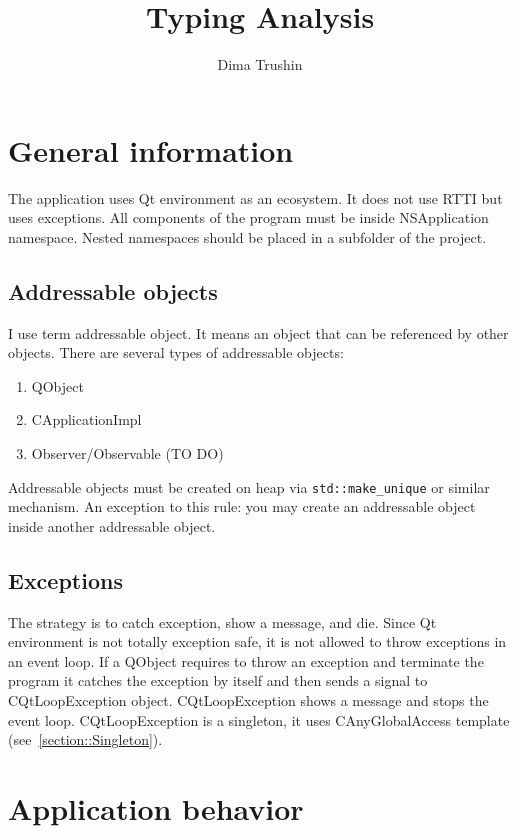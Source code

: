 \documentclass{article}
\begin{document}
\title{Typing Analysis}
\author{Dima Trushin}
\date{}
	
\maketitle
\tableofcontents

\newpage

\section{General information}

The application uses Qt environment as an ecosystem. It does not use RTTI but uses exceptions. All components of the program must be inside NSApplication namespace. Nested namespaces should be placed in a subfolder of the project.

\subsection{Addressable objects}

I use term addressable object. It means an object that can be referenced by other objects. There are several types of addressable objects:
\begin{enumerate}
\item QObject
\item CApplicationImpl
\item Observer/Observable (TO DO)
\end{enumerate}
Addressable objects must be created on heap via \verb"std::make_unique" or similar mechanism. An exception to this rule: you may create an addressable object inside another addressable object.

\subsection{Exceptions}

The strategy is to catch exception, show a message, and die. Since Qt environment is not totally exception safe, it is not allowed to throw exceptions in an event loop. If a QObject requires to throw an exception and terminate the program it catches the exception by itself and then sends a signal to CQtLoopException object. CQtLoopException shows a message and stops the event loop. CQtLoopException is a singleton, it uses CAnyGlobalAccess template (see~\ref{section::Singleton}).

\section{Application behavior}
\end{document}
